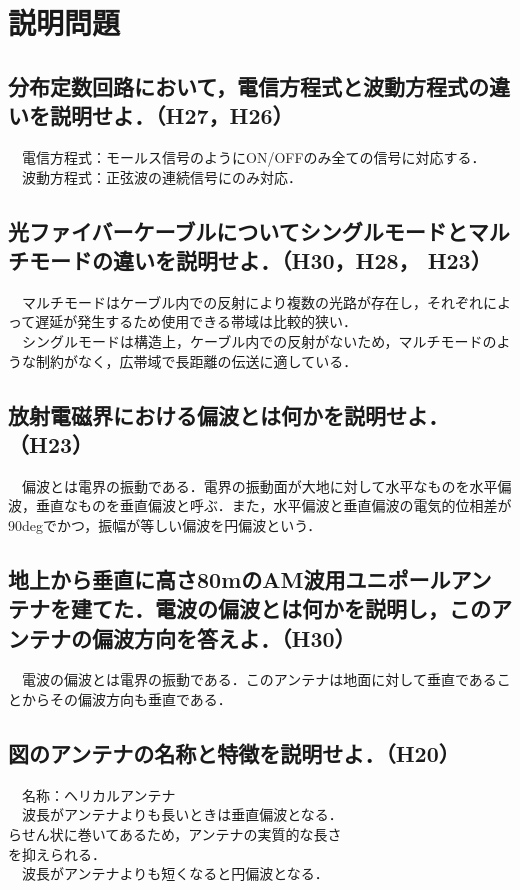 

\pagestyle{fancy}
\section{説明問題}
\subsection{分布定数回路において，電信方程式と波動方程式の違いを説明せよ．（H27，H26）}
　電信方程式：モールス信号のようにON/OFFのみ全ての信号に対応する．\\
　波動方程式：正弦波の連続信号にのみ対応．\\

\subsection{光ファイバーケーブルについてシングルモードとマルチモードの違いを説明せよ．（H30，H28， H23）}
　マルチモードはケーブル内での反射により複数の光路が存在し，それぞれによって遅延が発生するため使用できる帯域は比較的狭い．\\
　シングルモードは構造上，ケーブル内での反射がないため，マルチモードのような制約がなく，広帯域で長距離の伝送に適している．\\

\subsection{放射電磁界における偏波とは何かを説明せよ．（H23）}
　偏波とは電界の振動である．電界の振動面が大地に対して水平なものを水平偏波，垂直なものを垂直偏波と呼ぶ．また，水平偏波と垂直偏波の電気的位相差が90degでかつ，振幅が等しい偏波を円偏波という．\\

\subsection{地上から垂直に高さ80mのAM波用ユニポールアンテナを建てた．電波の偏波とは何かを説明し，このアンテナの偏波方向を答えよ．（H30）}
　電波の偏波とは電界の振動である．このアンテナは地面に対して垂直であることからその偏波方向も垂直である．\\

\subsection{図のアンテナの名称と特徴を説明せよ．（H20）}
　名称：ヘリカルアンテナ\\
　波長がアンテナよりも長いときは垂直偏波となる．\\
らせん状に巻いてあるため，アンテナの実質的な長さ\\
を抑えられる．\\
　波長がアンテナよりも短くなると円偏波となる．\\

